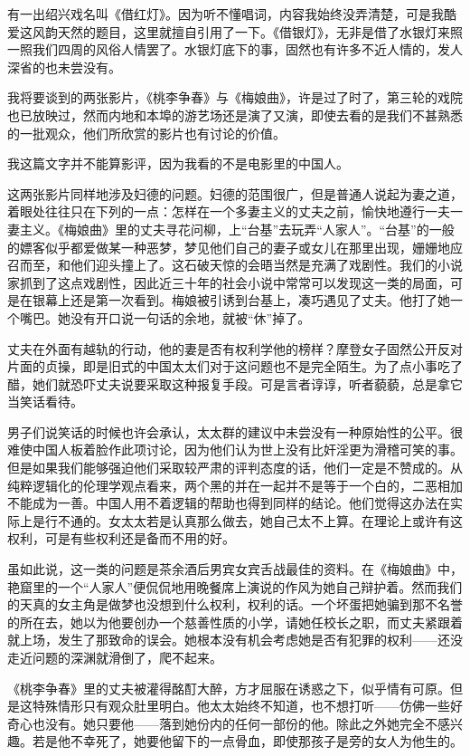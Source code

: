 \par 有一出绍兴戏名叫《借红灯》。因为听不懂唱词，内容我始终没弄清楚，可是我酷爱这风韵天然的题目，这里就擅自引用了一下。《借银灯》，无非是借了水银灯来照一照我们四周的风俗人情罢了。水银灯底下的事，固然也有许多不近人情的，发人深省的也未尝没有。
\par 我将要谈到的两张影片，《桃李争春》与《梅娘曲》，许是过了时了，第三轮的戏院也已放映过，然而内地和本埠的游艺场还是演了又演，即使去看的是我们不甚熟悉的一批观众，他们所欣赏的影片也有讨论的价值。
\par 我这篇文字并不能算影评，因为我看的不是电影里的中国人。
\par 这两张影片同样地涉及妇德的问题。妇德的范围很广，但是普通人说起为妻之道，着眼处往往只在下列的一点：怎样在一个多妻主义的丈夫之前，愉快地遵行一夫一妻主义。《梅娘曲》里的丈夫寻花问柳，上“台基”去玩弄“人家人”。“台基”的一般的嫖客似乎都爱做某一种恶梦，梦见他们自己的妻子或女儿在那里出现，姗姗地应召而至，和他们迎头撞上了。这石破天惊的会晤当然是充满了戏剧性。我们的小说家抓到了这点戏剧性，因此近三十年的社会小说中常常可以发现这一类的局面，可是在银幕上还是第一次看到。梅娘被引诱到台基上，凑巧遇见了丈夫。他打了她一个嘴巴。她没有开口说一句话的余地，就被“休”掉了。
\par 丈夫在外面有越轨的行动，他的妻是否有权利学他的榜样？摩登女子固然公开反对片面的贞操，即是旧式的中国太太们对于这问题也不是完全陌生。为了点小事吃了醋，她们就恐吓丈夫说要采取这种报复手段。可是言者谆谆，听者藐藐，总是拿它当笑话看待。
\par 男子们说笑话的时候也许会承认，太太群的建议中未尝没有一种原始性的公平。很难使中国人板着脸作此项讨论，因为他们认为世上没有比奸淫更为滑稽可笑的事。但是如果我们能够强迫他们采取较严肃的评判态度的话，他们一定是不赞成的。从纯粹逻辑化的伦理学观点看来，两个黑的并在一起并不是等于一个白的，二恶相加不能成为一善。中国人用不着逻辑的帮助也得到同样的结论。他们觉得这办法在实际上是行不通的。女太太若是认真那么做去，她自己太不上算。在理论上或许有这权利，可是有些权利还是备而不用的好。
\par 虽如此说，这一类的问题是茶余酒后男宾女宾舌战最佳的资料。在《梅娘曲》中，艳窟里的一个“人家人”便侃侃地用晚餐席上演说的作风为她自己辩护着。然而我们的天真的女主角是做梦也没想到什么权利，权利的话。一个坏蛋把她骗到那不名誉的所在去，她以为他要创办一个慈善性质的小学，请她任校长之职，而丈夫紧跟着就上场，发生了那致命的误会。她根本没有机会考虑她是否有犯罪的权利——还没走近问题的深渊就滑倒了，爬不起来。
\par 《桃李争春》里的丈夫被灌得酩酊大醉，方才屈服在诱惑之下，似乎情有可原。但是这特殊情形只有观众肚里明白。他太太始终不知道，也不想打听——仿佛一些好奇心也没有。她只要他——落到她份内的任何一部份的他。除此之外她完全不感兴趣。若是他不幸死了，她要他留下的一点骨血，即使那孩子是旁的女人为他生的。
